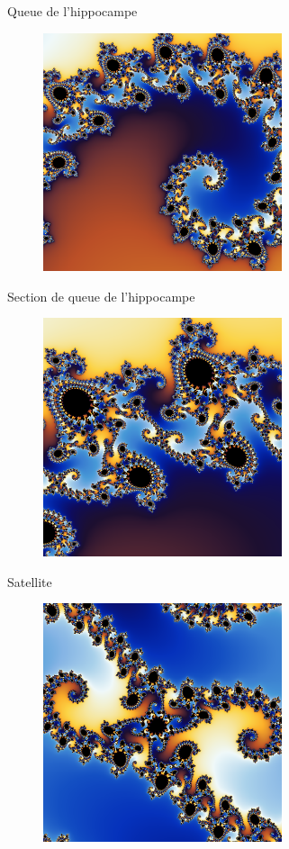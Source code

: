 \documentclass{beamer}
\begin{document}
\begin{frame}{Queue de l'hippocampe}
\begin{figure}[H]
  \centering
  \includegraphics[width=70mm]{queue.png}
 \end{figure}
\end{frame}

\begin{frame}{Section de queue de l'hippocampe}
\begin{figure}[H]
  \centering
  \includegraphics[width=70mm]{section.png}
 \end{figure}
\end{frame}

\begin{frame}{Satellite}
\begin{figure}[H]
  \centering
  \includegraphics[width=70mm]{satellite.png}
 \end{figure}
\end{frame}
\end{document}
